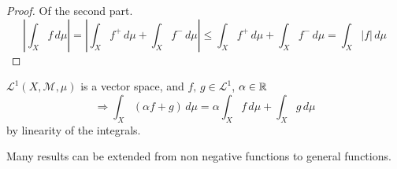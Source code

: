 \begin{proof}
    Of the second part.
    \[
        \left| \int_X f \, d\mu \right| = \left| \int_X f^+ \, d\mu + \int_X f^- \, d\mu\right| \leq \int_X f^+ \, d\mu + \int_X f^- \, d\mu = \int_X |f| \, d\mu  
    \]
\end{proof}

\begin{proposition}
    \(\mathcal{L}^1(X, \mathcal{M}, \mu)\) is a vector space, and \(f, \, g \in \mathcal{L}^1\), \(\alpha \in \mathbb{R}\)
    \[
        \Rightarrow \int_X \left(\alpha f + g \right) \, d\mu = \alpha \int_X f \, d\mu + \int_X g \, d\mu 
    \]  
    by linearity of the integrals.
\end{proposition}

Many results can be extended from non negative functions to general functions.

